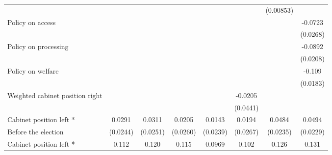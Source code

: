 \begin{table}[htbp]
\begin{tabular}{l*{7}{c}}
                    &                     &                     &                     &                     &                     &   (0.00853)         &                     \\
[0,5em]
Policy on access    &                     &                     &                     &                     &                     &                     &     -0.0723\sym{**} \\
                    &                     &                     &                     &                     &                     &                     &    (0.0268)         \\
[0,5em]
Policy on processing&                     &                     &                     &                     &                     &                     &     -0.0892\sym{***}\\
                    &                     &                     &                     &                     &                     &                     &    (0.0208)         \\
[0,5em]
Policy on welfare   &                     &                     &                     &                     &                     &                     &      -0.109\sym{***}\\
                    &                     &                     &                     &                     &                     &                     &    (0.0183)         \\
[0,5em]
Weighted cabinet position right&                     &                     &                     &                     &     -0.0205         &                     &                     \\
                    &                     &                     &                     &                     &    (0.0441)         &                     &                     \\
[0,5em]
Cabinet position left * &      0.0291         &      0.0311         &      0.0205         &      0.0143         &      0.0194         &      0.0484\sym{*}  &      0.0494\sym{*}  \\
Before the election                    &    (0.0244)         &    (0.0251)         &    (0.0260)         &    (0.0239)         &    (0.0267)         &    (0.0235)         &    (0.0229)         \\
[0,5em]
Cabinet position left * &       0.112\sym{***}&       0.120\sym{***}&       0.115\sym{***}&      0.0969\sym{***}&       0.102\sym{***}&       0.126\sym{***}&       0.131\sym{***}\\

\end{tabular}
\end{table}
